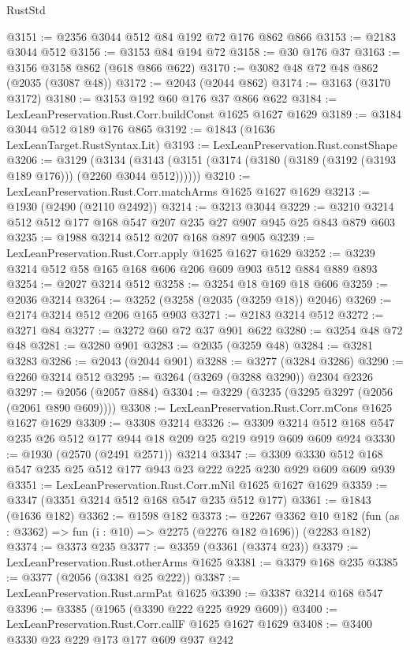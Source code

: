 \begin{lexlean}{RustStd}
\begin{coremodule}
@3151 := @2356 @3044 @512 @84 @192 @72 @176 @862 @866
@3153 := @2183 @3044 @512
@3156 := @3153 @84 @194 @72
@3158 := @30 @176 @37
@3163 := @3156 @3158 @862 (@618 @866 @622)
@3170 := @3082 @48 @72 @48 @862 (@2035 (@3087 @48))
@3172 := @2043 (@2044 @862)
@3174 := @3163 (@3170 @3172)
@3180 := @3153 @192 @60 @176 @37 @866 @622
@3184 := LexLeanPreservation.Rust.Corr.buildConst @1625 @1627 @1629
@3189 := @3184 @3044 @512 @189 @176 @865
@3192 := @1843 (@1636 LexLeanTarget.RustSyntax.Lit)
@3193 := LexLeanPreservation.Rust.constShape
@3206 := @3129
    (@3134 (@3143 (@3151 (@3174 (@3180 (@3189 (@3192 (@3193 @189 @176))) (@2260 @3044 @512))))))
@3210 := LexLeanPreservation.Rust.Corr.matchArms @1625 @1627 @1629
@3213 := @1930 (@2490 (@2110 @2492))
@3214 := @3213 @3044
@3229 := @3210 @3214 @512 @512 @177 @168 @547 @207 @235 @27 @907 @945 @25 @843 @879 @603
@3235 := @1988 @3214 @512 @207 @168 @897 @905
@3239 := LexLeanPreservation.Rust.Corr.apply @1625 @1627 @1629
@3252 := @3239 @3214 @512 @58 @165 @168 @606 @206 @609 @903 @512 @884 @889 @893
@3254 := @2027 @3214 @512
@3258 := @3254 @18 @169 @18 @606
@3259 := @2036 @3214
@3264 := @3252 (@3258 (@2035 (@3259 @18)) @2046)
@3269 := @2174 @3214 @512 @206 @165 @903
@3271 := @2183 @3214 @512
@3272 := @3271 @84
@3277 := @3272 @60 @72 @37 @901 @622
@3280 := @3254 @48 @72 @48
@3281 := @3280 @901
@3283 := @2035 (@3259 @48)
@3284 := @3281 @3283
@3286 := @2043 (@2044 @901)
@3288 := @3277 (@3284 @3286)
@3290 := @2260 @3214 @512
@3295 := @3264 (@3269 (@3288 @3290)) @2304 @2326
@3297 := @2056 (@2057 @884)
@3304 := @3229 (@3235 (@3295 @3297 (@2056 (@2061 @890 @609))))
@3308 := LexLeanPreservation.Rust.Corr.mCons @1625 @1627 @1629
@3309 := @3308 @3214
@3326 := @3309 @3214 @512 @168 @547 @235 @26 @512 @177 @944 @18 @209 @25 @219 @919 @609 @609 @924
@3330 := @1930 (@2570 (@2491 @2571)) @3214
@3347 := @3309 @3330 @512 @168 @547 @235 @25 @512 @177 @943 @23 @222 @225 @230 @929 @609 @609 @939
@3351 := LexLeanPreservation.Rust.Corr.mNil @1625 @1627 @1629
@3359 := @3347 (@3351 @3214 @512 @168 @547 @235 @512 @177)
@3361 := @1843 (@1636 @182)
@3362 := @1598 @182
@3373 := @2267
    @3362
    @10
    @182
    (fun (as : @3362) => fun (i : @10) => @2275 (@2276 @182 @1696))
    (@2283 @182)
@3374 := @3373 @235
@3377 := @3359 (@3361 (@3374 @23))
@3379 := LexLeanPreservation.Rust.otherArms @1625
@3381 := @3379 @168 @235
@3385 := @3377 (@2056 (@3381 @25 @222))
@3387 := LexLeanPreservation.Rust.armPat @1625
@3390 := @3387 @3214 @168 @547
@3396 := @3385 (@1965 (@3390 @222 @225 @929 @609))
@3400 := LexLeanPreservation.Rust.Corr.callF @1625 @1627 @1629
@3408 := @3400 @3330 @23 @229 @173 @177 @609 @937 @242

\end{coremodule}
\end{lexlean}
